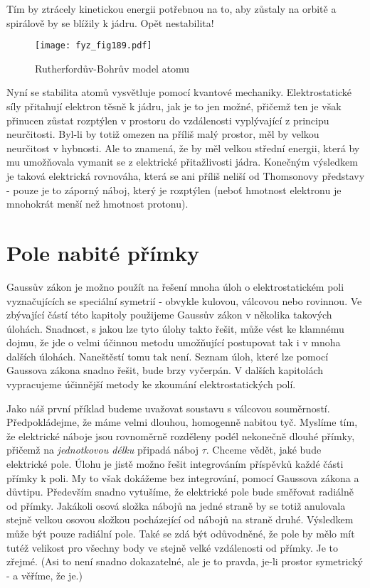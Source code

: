   Tím by ztrácely kinetickou energii potřebnou na to, aby zůstaly na orbitě a spirálově by se 
  blížily k jádru. Opět nestabilita!
  \begin{figure}[ht!] %
    \centering
    \texttt{[image: fyz\_fig189.pdf]}
    \caption{Rutherfordův-Bohrův model atomu}
    \label{fyz:fig189}
  \end{figure}      
  
  Nyní se stabilita atomů vysvětluje pomocí kvantové mechaniky. Elektrostatické síly přitahují
  elektron těsně k jádru, jak je to jen možné, přičemž ten je však přinucen zůstat rozptýlen v
  prostoru do vzdálenosti vyplývající z principu neurčitosti. Byl-li by totiž omezen na příliš malý
  prostor, měl by velkou neurčitost v hybnosti. Ale to znamená, že by měl velkou střední energii,
  která by mu umožňovala vymanit se z elektrické přitažlivosti jádra. Konečným výsledkem je taková
  elektrická rovnováha, která se ani příliš neliší od Thomsonovy představy - pouze je to záporný
  náboj, který je rozptýlen (neboť hmotnost elektronu je mnohokrát menší než hmotnost protonu).

\section{Pole nabité přímky}\label{fyz:IIchapVsecIV}
  Gaussův zákon je možno použít na řešení mnoha úloh o elektrostatickém poli vyznačujících se
  speciální symetrií - obvykle kulovou, válcovou nebo rovinnou. Ve zbývající částí této kapitoly
  použijeme Gaussův zákon v několika takových úlohách. Snadnost, s jakou lze tyto úlohy takto řešit,
  může vést ke klamnému dojmu, že jde o velmi účinnou metodu umožňující postupovat tak i v mnoha
  dalších úlohách. Naneštěstí tomu tak není. Seznam úloh, které lze pomocí Gaussova zákona snadno
  řešit, bude brzy vyčerpán. V dalších kapitolách vypracujeme účinnější metody ke zkoumání
  elektrostatických polí.
  
  Jako náš první příklad budeme uvažovat soustavu s válcovou souměrností. Předpokládejme, že máme
  velmi dlouhou, homogenně nabitou tyč. Myslíme tím, že elektrické náboje jsou rovnoměrně rozděleny
  podél nekonečně dlouhé přímky, přičemž na \emph{jednotkovou délku} připadá náboj \(\tau\). Chceme
  vědět, jaké bude elektrické pole. Úlohu je jistě možno řešit integrováním příspěvků každé části
  přímky k poli. My to však dokážeme bez integrování, pomocí Gaussova zákona a důvtipu. Především
  snadno vytušíme, že elektrické pole bude směřovat radiálně od přímky. Jakákoli osová složka nábojů
  na jedné straně by se totiž anulovala stejně velkou osovou složkou pocházející od nábojů na straně
  druhé. Výsledkem může být pouze radiální pole. Také se zdá být odůvodněné, že pole by mělo mít
  tutéž velikost pro všechny body ve stejně velké vzdálenosti od přímky. Je to zřejmé. (Asi to není
  snadno dokazatelné, ale je to pravda, je-li prostor symetrický - a věříme, že je.)
  
